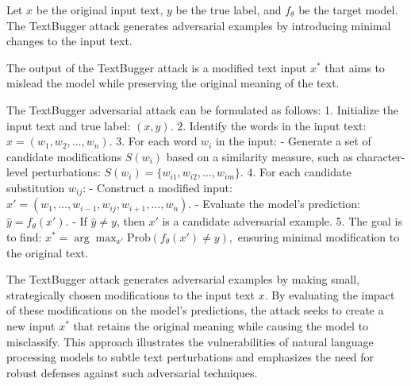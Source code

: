Let \( x \) be the original input text, \( y \) be the true label, and \( f_{\theta} \) be the target model. The TextBugger attack generates adversarial examples by introducing minimal changes to the input text.

The output of the TextBugger attack is a modified text input \( x^* \) that aims to mislead the model while preserving the original meaning of the text.


The TextBugger adversarial attack can be formulated as follows:
1. Initialize the input text and true label:
   $
   (x, y).
   $
2. Identify the words in the input text:
   $
   x = (w_1, w_2, \ldots, w_n).
   $
3. For each word \( w_i \) in the input:
   - Generate a set of candidate modifications \( S(w_i) \) based on a similarity measure, such as character-level perturbations:
   $
   S(w_i) = \{w_{i1}, w_{i2}, \ldots, w_{im}\}.
   $
4. For each candidate substitution \( w_{ij} \):
   - Construct a modified input:
   $
   x' = (w_1, \ldots, w_{i-1}, w_{ij}, w_{i+1}, \ldots, w_n).
   $
   - Evaluate the model's prediction:
   $
   \hat{y} = f_{\theta}(x').
   $
   - If \( \hat{y} \neq y \), then \( x' \) is a candidate adversarial example.
5. The goal is to find:
   $
   x^* = \arg\max_{x'} \text{Prob}(f_{\theta}(x') \neq y),
   $
   ensuring minimal modification to the original text.

The TextBugger attack generates adversarial examples by making small, strategically chosen modifications to the input text \( x \). By evaluating the impact of these modifications on the model's predictions, the attack seeks to create a new input \( x^* \) that retains the original meaning while causing the model to misclassify. This approach illustrates the vulnerabilities of natural language processing models to subtle text perturbations and emphasizes the need for robust defenses against such adversarial techniques.
